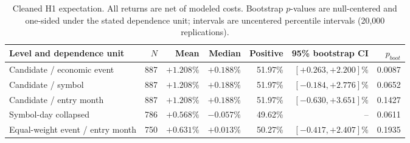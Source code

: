 \begin{table}[t]
\caption{Cleaned H1 expectation. All returns are net of modeled costs. Bootstrap $p$-values are null-centered and one-sided under the stated dependence unit; intervals are uncentered percentile intervals (20{,}000 replications).}
\label{tab:h1}
\centering
\small
\begin{tabular}{lrrrrrr}
\toprule
Level and dependence unit & $N$ & Mean & Median & Positive & 95\% bootstrap CI & $p_{boot}$ \\
\midrule
Candidate / economic event & 887 & $+1.208\%$ & $+0.188\%$ & 51.97\% & $[+0.263,+2.200]\%$ & 0.0087 \\
Candidate / symbol & 887 & $+1.208\%$ & $+0.188\%$ & 51.97\% & $[-0.184,+2.776]\%$ & 0.0652 \\
Candidate / entry month & 887 & $+1.208\%$ & $+0.188\%$ & 51.97\% & $[-0.630,+3.651]\%$ & 0.1427 \\
Symbol-day collapsed & 786 & $+0.568\%$ & $-0.057\%$ & 49.62\% & -- & 0.0611 \\
Equal-weight event / entry month & 750 & $+0.631\%$ & $+0.013\%$ & 50.27\% & $[-0.417,+2.407]\%$ & 0.1935 \\
\bottomrule
\end{tabular}
\end{table}
